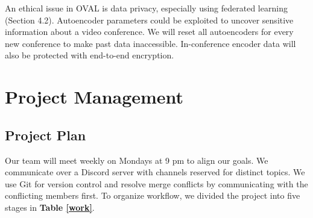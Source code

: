 \documentclass[letter, 12pt]{article}
\begin{document}
An ethical issue in OVAL is data privacy, especially using federated learning (Section 4.2). Autoencoder parameters could be exploited to uncover sensitive information about a video conference. We will reset all autoencoders for every new conference to make past data inaccessible. In-conference encoder data will also be protected with end-to-end encryption.
\section{Project Management}

\subsection{Project Plan}

Our team will meet weekly on Mondays at 9 pm to align our goals. We communicate over a Discord server with channels reserved for distinct topics. We use Git for version control and resolve merge conflicts by communicating with the conflicting members first. To organize workflow, we divided the project into five stages in \textbf{Table \ref{work}}.
\end{document}
